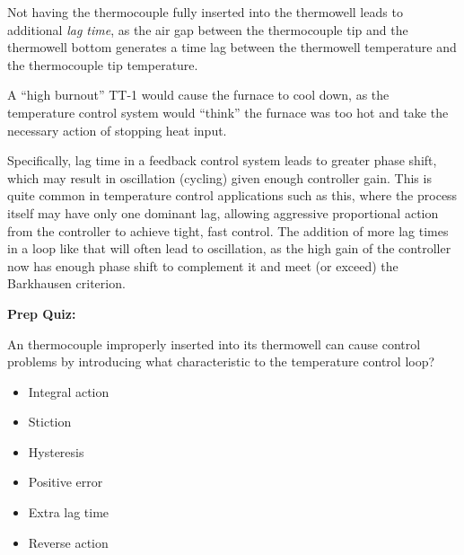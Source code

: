 





Not having the thermocouple fully inserted into the thermowell leads to additional {\it lag time}, as the air gap between the thermocouple tip and the thermowell bottom generates a time lag between the thermowell temperature and the thermocouple tip temperature. 







A ``high burnout'' TT-1 would cause the furnace to cool down, as the temperature control system would ``think'' the furnace was too hot and take the necessary action of stopping heat input.

\vskip 10pt

Specifically, lag time in a feedback control system leads to greater phase shift, which may result in oscillation (cycling) given enough controller gain.  This is quite common in temperature control applications such as this, where the process itself may have only one dominant lag, allowing aggressive proportional action from the controller to achieve tight, fast control.  The addition of more lag times in a loop like that will often lead to oscillation, as the high gain of the controller now has enough phase shift to complement it and meet (or exceed) the Barkhausen criterion.

\vfil \eject

\noindent
{\bf Prep Quiz:}

An thermocouple improperly inserted into its thermowell can cause control problems by introducing what characteristic to the temperature control loop?

\begin{itemize}
\item{} Integral action
\vskip 10pt
\item{} Stiction
\vskip 10pt
\item{} Hysteresis
\vskip 10pt
\item{} Positive error
\vskip 10pt
\item{} Extra lag time
\vskip 10pt
\item{} Reverse action
\end{itemize}





